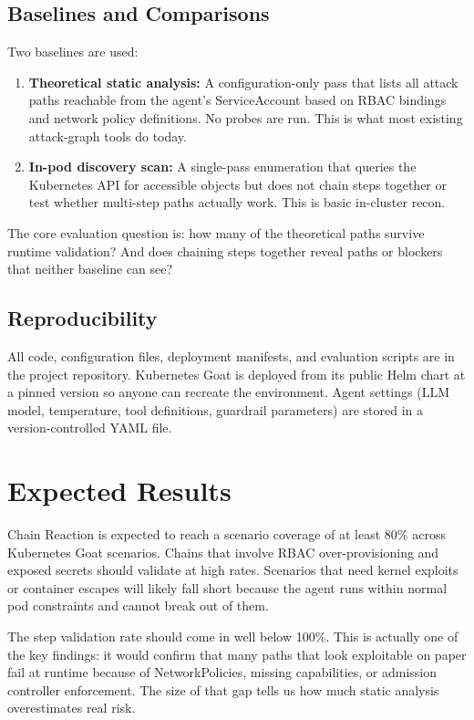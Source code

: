 \documentclass[conference]{IEEEtran}
\begin{document}
\subsection{Baselines and Comparisons}
Two baselines are used:
\begin{enumerate}
    \item \textbf{Theoretical static analysis:} A configuration-only pass that lists all attack paths reachable from the agent's ServiceAccount based on RBAC bindings and network policy definitions. No probes are run. This is what most existing attack-graph tools do today.
    \item \textbf{In-pod discovery scan:} A single-pass enumeration that queries the Kubernetes API for accessible objects but does not chain steps together or test whether multi-step paths actually work. This is basic in-cluster recon.
\end{enumerate}

The core evaluation question is: how many of the theoretical paths survive runtime validation? And does chaining steps together reveal paths or blockers that neither baseline can see?

\subsection{Reproducibility}
All code, configuration files, deployment manifests, and evaluation scripts are in the project repository. Kubernetes Goat is deployed from its public Helm chart at a pinned version so anyone can recreate the environment. Agent settings (LLM model, temperature, tool definitions, guardrail parameters) are stored in a version-controlled YAML file.

\section{Expected Results}

Chain Reaction is expected to reach a scenario coverage of at least 80\% across Kubernetes Goat scenarios. Chains that involve RBAC over-provisioning and exposed secrets should validate at high rates. Scenarios that need kernel exploits or container escapes will likely fall short because the agent runs within normal pod constraints and cannot break out of them.

The step validation rate should come in well below 100\%. This is actually one of the key findings: it would confirm that many paths that look exploitable on paper fail at runtime because of NetworkPolicies, missing capabilities, or admission controller enforcement. The size of that gap tells us how much static analysis overestimates real risk.
\end{document}
